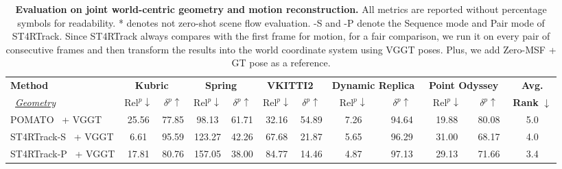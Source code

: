 
\begin{table}[t]
\centering
\caption{
\textbf{Evaluation on joint world-centric geometry and motion reconstruction.}
All metrics are reported without percentage symbols for readability.
* denotes not zero-shot scene flow evaluation.
-S and -P denote the Sequence mode and Pair mode of ST4RTrack.
Since ST4RTrack always compares with the first frame for motion,
for a fair comparison, we run it on every pair of consecutive frames and then transform the results into the world coordinate system using VGGT poses.
Plus, we add Zero-MSF + GT pose as a reference.
}

\label{tab:joint_geo_motion}
\begin{adjustbox}{width=\textwidth}
\begin{tabular}{@{}l cc cc cc cc cc c@{}}
\toprule
\multirow{1}{*}{\textbf{Method}} &
\multicolumn{2}{c}{\textbf{Kubric}~\cite{greff2021kubric}} &
\multicolumn{2}{c}{\textbf{Spring}~\cite{Mehl2023_Spring}} &
\multicolumn{2}{c}{\textbf{VKITTI2}~\cite{cabon2020virtual}} &
\multicolumn{2}{c}{\textbf{Dynamic Replica}~\cite{karaev2023dynamicstereo}} &
\multicolumn{2}{c}{\textbf{Point Odyssey}~\cite{zheng2023pointodyssey}} &
\textbf{Avg.} \\
\cmidrule(lr){2-3} \cmidrule(lr){4-5} \cmidrule(lr){6-7} \cmidrule(lr){8-9} \cmidrule(lr){10-11}
\ \underline{\emph{Geometry}} &
$\text{Rel}^{p}\!\downarrow$ & $\delta^{p}\!\uparrow$ &
$\text{Rel}^{p}\!\downarrow$ & $\delta^{p}\!\uparrow$ &
$\text{Rel}^{p}\!\downarrow$ & $\delta^{p}\!\uparrow$ &
$\text{Rel}^{p}\!\downarrow$ & $\delta^{p}\!\uparrow$ &
$\text{Rel}^{p}\!\downarrow$ & $\delta^{p}\!\uparrow$ &
\textbf{Rank} $\!\downarrow$ \\
\cmidrule(lr){2-12}
POMATO~\cite{zhang2025pomato} + VGGT & 25.56 & 77.85 & 98.13 & 61.71 & 32.16 & 54.89 & 7.26 & 94.64 & 19.88 & 80.08 & 5.0 \\
ST4RTrack-S~\cite{st4rtrack2025} + VGGT & 6.61 & 95.59 & 123.27 & 42.26 & 67.68 & 21.87 & 5.65 & 96.29 & 31.00 & 68.17 & 4.0 \\
ST4RTrack-P~\cite{st4rtrack2025} + VGGT & 17.81 & 80.76 & 157.05 & 38.00 & 84.77 & 14.46 & 4.87 & 97.13 & 29.13 & 71.66 & 3.4 \\

\end{tabular}
\end{adjustbox}
\end{table}
